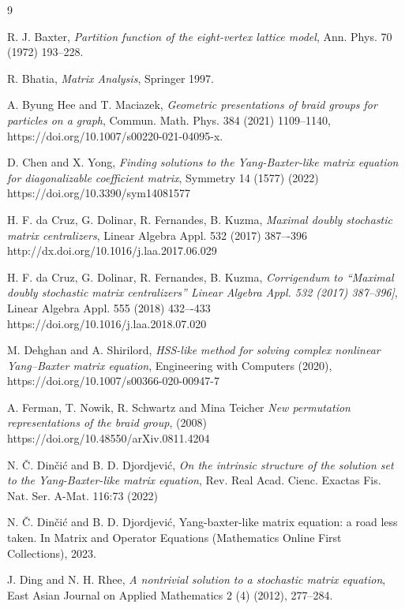 \documentclass{article}
\theoremstyle{definition}\newtheorem{example}{Example}[section]
\begin{document}
	\begin{thebibliography}{9}
		
		
		 R. J. Baxter, {\it Partition function of the eight-vertex lattice model}, Ann. Phys. 70 (1972) 193–228.
		
		 R. Bhatia, {\it Matrix Analysis}, Springer 1997.
		
		 A. Byung Hee and T. Maciazek, {\it  Geometric presentations of braid groups for particles on a graph},
		Commun. Math. Phys. 384 (2021) 1109–1140, https://doi.org/10.1007/s00220-021-04095-x.
		
		 D. Chen and X. Yong, {\it Finding solutions to the Yang-Baxter-like matrix equation for diagonalizable coefficient matrix}, Symmetry 14 (1577) (2022) https://doi.org/10.3390/sym14081577
		
		 H. F. da Cruz, G. Dolinar, R. Fernandes, B. Kuzma, {\it Maximal doubly stochastic matrix centralizers}, Linear Algebra Appl. 532 (2017) 387–-396  http://dx.doi.org/10.1016/j.laa.2017.06.029
		
		 H. F. da Cruz, G. Dolinar, R. Fernandes, B. Kuzma, {\it Corrigendum to “Maximal doubly stochastic matrix centralizers” Linear Algebra Appl. 532 (2017) 387–396]}, Linear Algebra Appl.  555 (2018) 432–-433 https://doi.org/10.1016/j.laa.2018.07.020
		
		 M. Dehghan and A. Shirilord, {\it HSS-like method for solving complex nonlinear Yang--Baxter matrix equation}, Engineering with Computers (2020), https://doi.org/10.1007/s00366-020-00947-7
		
		 A. Ferman, T. Nowik, R. Schwartz and Mina Teicher {\it New permutation representations
			of the braid group}, (2008)
		https://doi.org/10.48550/arXiv.0811.4204
		
		
		 N. \v C. Din\v ci\'c and B. D. Djordjevi\'c, {\it On the intrinsic structure of the solution set to the Yang-Baxter-like matrix equation}, Rev. Real Acad. Cienc. Exactas Fis. Nat. Ser. A-Mat. 116:73 (2022)
		
		N. \v C. Din\v ci\'c and B. D. Djordjevi\'c, Yang-baxter-like matrix equation: a road less taken. In Matrix and Operator
		Equations (Mathematics Online First Collections), 2023.
		
		 J. Ding and N. H. Rhee, {\it A nontrivial solution to a stochastic matrix equation}, East Asian Journal on Applied Mathematics  2 (4) (2012), 277--284.
		

\end{thebibliography}
\end{document}
